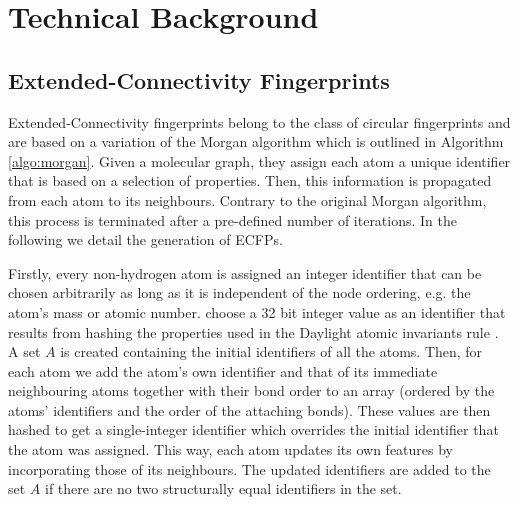 \section{Technical Background}
\subsection{Extended-Connectivity Fingerprints}
\label{sec:circ_finger}

Extended-Connectivity fingerprints belong to the class of circular fingerprints and are based on a variation of the Morgan algorithm \citep{morgan} which is outlined in Algorithm \ref{algo:morgan}. Given a molecular graph, they assign each atom a unique identifier that is based on a selection of properties. Then, this information is propagated from each atom to its neighbours. Contrary to the original Morgan algorithm, this process is terminated after a pre-defined number of iterations. In the following we detail the generation of ECFPs.


Firstly, every non-hydrogen atom is assigned an integer identifier that can be chosen arbitrarily as long as it is independent of the node ordering, e.g. the atom's mass or atomic number. \cite{ECFP} choose a 32 bit integer value as an identifier that results from hashing the properties used in the Daylight atomic invariants rule \citep{smiles2}. A set $A$ is created containing the initial identifiers of all the atoms. Then, for each atom we add the atom's own identifier and that of its immediate neighbouring atoms together with their bond order to an array (ordered by the atoms' identifiers and the order of the attaching bonds). These values are then hashed to get a single-integer identifier which overrides the initial identifier that the atom was assigned. This way, each atom updates its own features by incorporating those of its neighbours. The updated identifiers are added to the set $A$ if there are no two structurally equal identifiers in the set.

